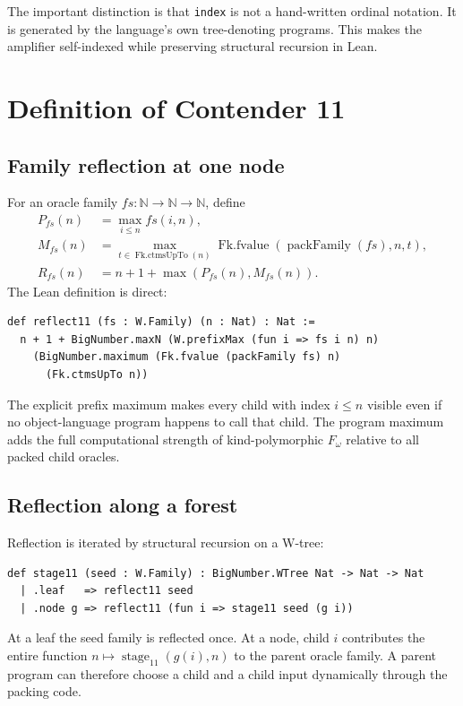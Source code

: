 \documentclass[11pt]{article}
\theoremstyle{definition}
\theoremstyle{remark}
\newcommand{\N}{\mathbb{N}}
\newcommand{\lean}[1]{\texttt{#1}}
\begin{document}
The important distinction is that \lean{index} is not a hand-written ordinal
notation.  It is generated by the language's own tree-denoting programs.  This
makes the amplifier self-indexed while preserving structural recursion in Lean.

\section{Definition of Contender 11}

\subsection{Family reflection at one node}

For an oracle family $fs:\N\to\N\to\N$, define
\begin{align*}
 P_{fs}(n)
   &= \max_{i\le n} fs(i,n),\\
 M_{fs}(n)
   &= \max_{t\in\operatorname{Fk.ctmsUpTo}(n)}
        \operatorname{Fk.fvalue}
          (\operatorname{packFamily}(fs),n,t),\\
 R_{fs}(n)
   &=n+1+\max(P_{fs}(n),M_{fs}(n)).
\end{align*}
The Lean definition is direct:
\begin{lstlisting}
def reflect11 (fs : W.Family) (n : Nat) : Nat :=
  n + 1 + BigNumber.maxN (W.prefixMax (fun i => fs i n) n)
    (BigNumber.maximum (Fk.fvalue (packFamily fs) n)
      (Fk.ctmsUpTo n))
\end{lstlisting}
The explicit prefix maximum makes every child with index $i\le n$ visible even
if no object-language program happens to call that child.  The program maximum
adds the full computational strength of kind-polymorphic $F_\omega$ relative to
all packed child oracles.

\subsection{Reflection along a forest}

Reflection is iterated by structural recursion on a W-tree:
\begin{lstlisting}
def stage11 (seed : W.Family) : BigNumber.WTree Nat -> Nat -> Nat
  | .leaf   => reflect11 seed
  | .node g => reflect11 (fun i => stage11 seed (g i))
\end{lstlisting}
At a leaf the seed family is reflected once.  At a node, child $i$ contributes
the entire function $n\mapsto\operatorname{stage}_{11}(g(i),n)$ to the parent
oracle family.  A parent program can therefore choose a child and a child input
dynamically through the packing code.
\end{document}
